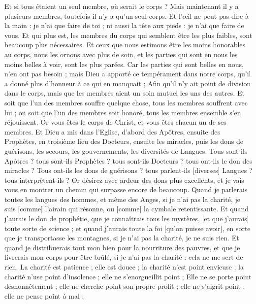\begin{multicols}{2}
Et si tous étaient un seul membre, où serait le corps ?
Mais maintenant il y a plusieurs membres, toutefois il n'y a qu'un seul corps.
Et l'œil ne peut pas dire à la main : je n'ai que faire de toi ; ni aussi la tête aux pieds : je n'ai que faire de vous.
Et qui plus est, les membres du corps qui semblent être les plus faibles, sont beaucoup plus nécessaires.
Et ceux que nous estimons être les moins honorables au corps, nous les ornons avec plus de soin, et les parties qui sont en nous les moins belles à voir, sont les plus parées.
Car les parties qui sont belles en nous, n'en ont pas besoin ; mais Dieu a apporté ce tempérament dans notre corps, qu'il a donné plus d'honneur à ce qui en manquait ;
Afin qu'il n'y ait point de division dans le corps, mais que les membres aient un soin mutuel les uns des autres.
Et soit que l'un des membres souffre quelque chose, tous les membres souffrent avec lui ; ou soit que l'un des membres soit honoré, tous les membres ensemble s'en réjouissent.
Or vous êtes le corps de Christ, et vous êtes chacun un de ses membres.
Et Dieu a mis dans l'Eglise, d'abord des Apôtres, ensuite des Prophètes, en troisième lieu des Docteurs, ensuite les miracles, puis les dons de guérisons, les secours, les gouvernements, les diversités de Langues.
Tous sont-ils Apôtres ? tous sont-ils Prophètes ? tous sont-ils Docteurs ? tous ont-ils le don des miracles ?
Tous ont-ils les dons de guérisons ? tous parlent-ils [diverses] Langues ? tous interprètent-ils ?
Or désirez avec ardeur des dons plus excellents, et je vais vous en montrer un chemin qui surpasse encore de beaucoup.
\VerseOne{}Quand je parlerais toutes les langues des hommes, et même des Anges, si je n'ai pas la charité, je suis [comme] l'airain qui résonne, ou [comme] la cymbale retentissante.
Et quand j'aurais le don de prophétie, que je connaîtrais tous les mystères, [et que j'aurais] toute sorte de science ; et quand j'aurais toute la foi [qu'on puisse avoir], en sorte que je transportasse les montagnes, si je n'ai pas la charité, je ne suis rien.
Et quand je distribuerais tout mon bien pour la nourriture des pauvres, et que je livrerais mon corps pour être brûlé, si je n'ai pas la charité : cela ne me sert de rien.
La charité est patience ; elle est douce ; la charité n'est point envieuse ; la charité n'use point d'insolence ; elle ne s'enorgueillit point ;
Elle ne se porte point déshonnêtement ; elle ne cherche point son propre profit ; elle ne s'aigrit point ; elle ne pense point à mal ;

\end{multicols}
